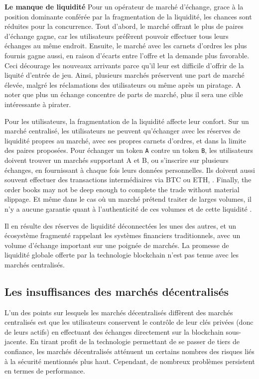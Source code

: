 \documentclass[UTF8,nofonts]{article}
\begin{document}
\begin{multicols}{2}
\textbf{Le manque de liquidité} Pour un opérateur de marché d'échange, grace à  la position dominante conférée par la fragmentation de la liquidité, les chances sont réduites pour la concurrence. Tout d'abord, le marché offrant le plus de paires d'échange gagne, car les utilisateurs préfèrent pouvoir effectuer tous leurs échanges au même endroit. Ensuite, le marché avec les carnets d'ordres les plus fournis gagne aussi, en raison d'écarts entre l'offre et la demande plus favorable. Ceci décourage les nouveaux arrivants parce qu'il leur est difficile d'offrir de la liquité d'entrée de jeu. Ainsi, plusieurs marchés préservent une part de marché élevée, malgré les réclamations des utilisateurs ou même après un piratage. A noter que plus un échange concentre de parts de marché, plus il sera une cible intéressante à pirater.

Pour les utilisateurs, la fragmentation de la liquidité affecte leur confort. Sur un marché centralisé, les utilisateurs ne peuvent qu'échanger avec les réserves de liquidité propres au marché, avec ses propres carnets d'ordres, et dans la limite des paires proposées. Pour échanger un token \verb|A| contre un token \verb|B|, les utilisateurs doivent trouver un marchés supportant A et B, ou s'inscrire sur plusieurs échanges, en fournissant à chaque fois leurs données personnelles. Ils doivent aussi souvent effectuer des transactions intermédiaires via BTC ou ETH, . Finally, the order books may not be deep enough to complete the trade without material slippage. Et même dans le cas où un marché prétend traiter de larges volumes, il n'y a aucune garantie quant à l'authenticité de ces volumes et de cette liquidité \cite{fakevolume}.

Il en résulte des réserves de liquidité déconnectées les unes des autres, et un écosystème fragmenté rappelant les systèmes financiers traditionnels, avec un volume d'échange important sur une poignée de marchés. La promesse de liquidité globale offerte par la technologie blockchain n'est pas tenue avec les marchés centralisés.

\subsection{Les insuffisances des marchés décentralisés}
L'un des points sur lesquels les marchés décentralisés diffèrent des marchés centralisés est que les utilisateurs conservent le contrôle de leur clés privées (donc de leurs actifs) en effectuant des échanges directement sur la blockchain sous-jacente. En tirant profit de la technologie permettant de se passer de tiers de confiance, les marchés décentralisés atténuent un certains nombres des risques liés à la sécurité mentionnés plus haut. Cependant, de nombreux problèmes persistent en termes de performance. 



\end{multicols}
\end{document}
